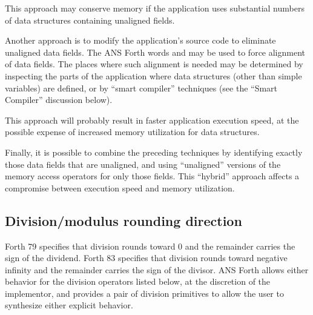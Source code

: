 \begin{description}
	This approach may conserve memory if the application uses
	substantial numbers of data structures containing unaligned
	fields.

	Another approach is to modify the application's source code to
	eliminate unaligned data fields. The ANS Forth words 
	and  may be used to force alignment of data fields.
	The places where such alignment is needed may be determined by
	inspecting the parts of the application where data structures
	(other than simple variables) are defined, or by ``smart compiler''
	techniques (see the ``Smart Compiler'' discussion below).

	This approach will probably result in faster application execution
	speed, at the possible expense of increased memory utilization for
	data structures.

	Finally, it is possible to combine the preceding techniques by
	identifying exactly those data fields that are unaligned, and
	using ``unaligned'' versions of the memory access operators for
	only those fields. This ``hybrid'' approach affects a compromise
	between execution speed and memory utilization.
\end{description}


\subsection{Division/modulus rounding direction} %

Forth 79 specifies that division rounds toward 0 and the remainder
carries the sign of the dividend. Forth 83 specifies that division
rounds toward negative infinity and the remainder carries the sign
of the divisor. ANS Forth allows either behavior for the division
operators listed below, at the discretion of the implementor, and
provides a pair of division primitives to allow the user to
synthesize either explicit behavior.

